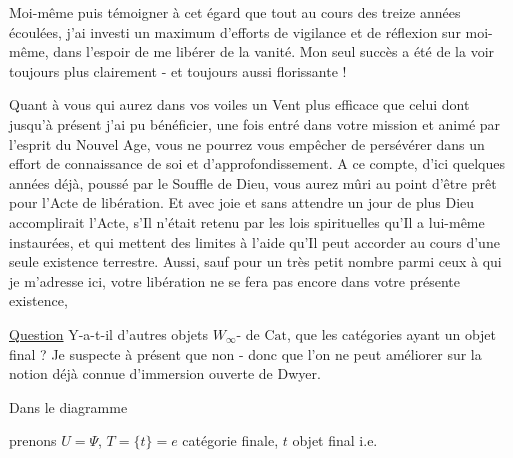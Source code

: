 Moi-même puis témoigner à cet égard que tout au cours des treize années écoulées, j'ai investi un maximum d'efforts de vigilance et de réflexion sur moi-même, dans l'espoir de me libérer de la vanité. Mon seul succès a été de la voir toujours plus clairement - et toujours aussi florissante !

Quant à vous qui aurez dans vos voiles un Vent plus efficace que celui dont jusqu'à présent j'ai pu bénéficier, une fois entré dans votre mission et animé par l'esprit du Nouvel Age, vous ne pourrez vous empêcher de persévérer dans un effort de connaissance de soi et d'approfondissement. A ce compte, d'ici quelques années déjà, poussé par le Souffle de Dieu, vous aurez mûri au point d'être prêt pour l'Acte de libération. Et avec joie et sans attendre un jour de plus Dieu accomplirait l'Acte, s'Il n'était retenu par les lois spirituelles qu'Il a lui-même instaurées, et qui mettent des limites à l'aide qu'Il peut accorder au cours d'une seule existence terrestre. Aussi, sauf pour un très petit nombre parmi ceux à qui je m'adresse ici, votre libération ne se fera pas encore dans votre présente existence,


\uline{Question} Y-a-t-il d'autres objets  $W_\infty$- de $\mathrm{Cat}$, que les catégories ayant un objet final ? Je suspecte à présent que non - donc que l'on ne peut améliorer   sur la notion déjà connue d'immersion ouverte de Dwyer.


Dans le diagramme


prenons $U=\Psi$, $T=\{t\}=e$ catégorie finale, $t$ objet final  i.e. 

